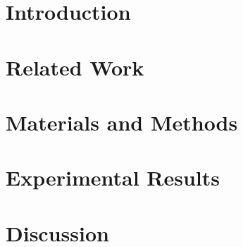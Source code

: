\documentclass[drones,article,submit,moreauthors]{Definitions/mdpi}
\begin{document}
\section{Introduction}


\section{Related Work}






\section{Materials and Methods}





\section{Experimental Results}






\section{Discussion}



\end{document}
